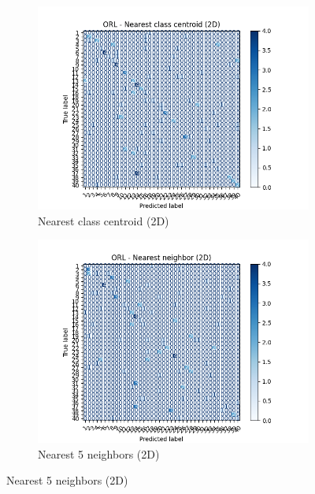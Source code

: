 \begin{figure}[htbp]
        \begin{subfigure}[b]{.33\linewidth}
                \centering
                \includegraphics[width=1\linewidth]{../source/orl/pictures/nearestClassCentroid-confusion-2d.png}
                \caption{Nearest class centroid (2D)}
                \label{fig:orl-confusion-ncc-2}
        \end{subfigure}%
        \begin{subfigure}[b]{0.33\linewidth}
                \centering
                \includegraphics[width=1\linewidth]{../source/orl/pictures/nearestNeighbor-5-confusion-2d.png}
                \caption{Nearest 5 neighbors (2D)}
                \label{fig:orl-confusion-nn-2}
        \end{subfigure}

\end{figure}
